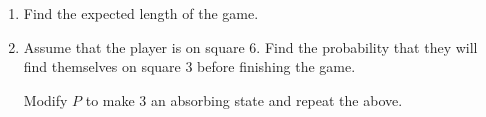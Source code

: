 \documentclass{article}
\begin{document}
\begin{enumerate}[label=(\alph*)]
	\item Find the expected length of the game.
	\item Assume that the player is on square 6.
		Find the probability that they will find themselves on square 3 before finishing the game.

		Modify $P$ to make $3$ an absorbing state and repeat the above.
\end{enumerate}
\end{document}

